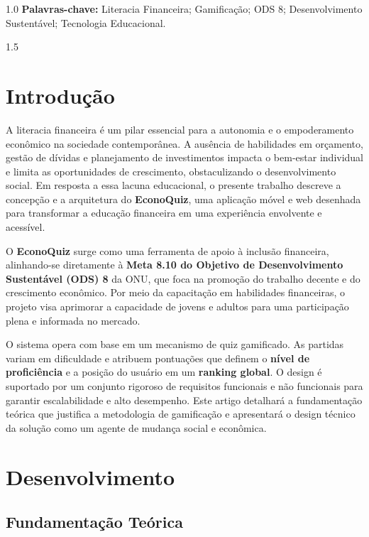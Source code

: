 \documentclass[a4paper, 12pt]{article}
\begin{document}
\vspace{1cm}
\begin{spacing}{1.0}
\noindent \textbf{Palavras-chave:} Literacia Financeira; Gamificação; ODS 8; Desenvolvimento Sustentável; Tecnologia Educacional.
\end{spacing}

\newpage
\begin{spacing}{1.5}


\section{Introdução}

A literacia financeira é um pilar essencial para a autonomia e o empoderamento econômico na sociedade contemporânea. A ausência de habilidades em orçamento, gestão de dívidas e planejamento de investimentos impacta o bem-estar individual e limita as oportunidades de crescimento, obstaculizando o desenvolvimento social. Em resposta a essa lacuna educacional, o presente trabalho descreve a concepção e a arquitetura do \textbf{EconoQuiz}, uma aplicação móvel e web desenhada para transformar a educação financeira em uma experiência envolvente e acessível.

O \textbf{EconoQuiz} surge como uma ferramenta de apoio à inclusão financeira, alinhando-se diretamente à \textbf{Meta 8.10 do Objetivo de Desenvolvimento Sustentável (ODS) 8} da ONU, que foca na promoção do trabalho decente e do crescimento econômico. Por meio da capacitação em habilidades financeiras, o projeto visa aprimorar a capacidade de jovens e adultos para uma participação plena e informada no mercado.

O sistema opera com base em um mecanismo de quiz gamificado. As partidas variam em dificuldade e atribuem pontuações que definem o \textbf{nível de proficiência} e a posição do usuário em um \textbf{ranking global}. O design é suportado por um conjunto rigoroso de requisitos funcionais e não funcionais para garantir escalabilidade e alto desempenho. Este artigo detalhará a fundamentação teórica que justifica a metodologia de gamificação e apresentará o design técnico da solução como um agente de mudança social e econômica.


\section{Desenvolvimento}

\subsection{Fundamentação Teórica}


\end{spacing}
\end{document}
